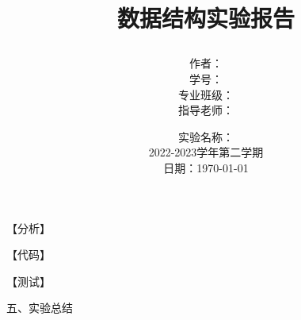 \documentclass[11pt,twoside,a4paper]{ctexart}
\title{
    \begin{huge}
    \textbf{数据结构实验报告}
    \author{作者：\\
    学号：\\
    专业班级：\\
    指导老师：}
    \date{实验名称：\\
    2022-2023学年第二学期\\
    日期：\today}
    \end{huge}
}
\begin{document}
\maketitle
\newpage

\begin{Large}
\end{Large}

\begin{Large}
\end{Large}

\begin{Large}
\end{Large}

\begin{Large}
\end{Large}

【分析】

【代码】




【测试】

五、实验总结
\end{document}
